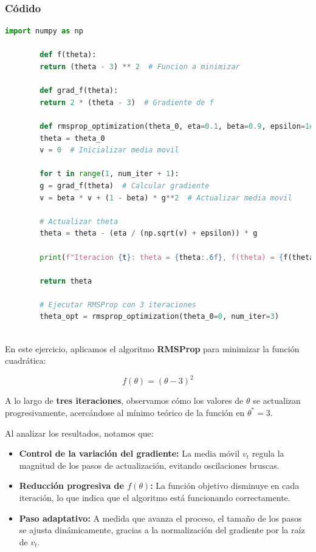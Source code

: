 \documentclass[a5paper]{article}
\begin{document}
	\subsubsection*{Códido}
	\begin{lstlisting}[language=Python, caption=Roor Mean Square Propagation, frame=single]
		import numpy as np
		
		def f(theta):
		return (theta - 3) ** 2  # Funcion a minimizar
		
		def grad_f(theta):
		return 2 * (theta - 3)  # Gradiente de f
		
		def rmsprop_optimization(theta_0, eta=0.1, beta=0.9, epsilon=1e-8, num_iter=3):
		theta = theta_0
		v = 0  # Inicializar media movil
		
		for t in range(1, num_iter + 1):
		g = grad_f(theta)  # Calcular gradiente
		v = beta * v + (1 - beta) * g**2  # Actualizar media movil
		
		# Actualizar theta
		theta = theta - (eta / (np.sqrt(v) + epsilon)) * g
		
		print(f"Iteracion {t}: theta = {theta:.6f}, f(theta) = {f(theta):.6f}, v = {v:.6f}")
		
		return theta
		
		# Ejecutar RMSProp con 3 iteraciones
		theta_opt = rmsprop_optimization(theta_0=0, num_iter=3)
		
	\end{lstlisting}
	
	En este ejercicio, aplicamos el algoritmo \textbf{RMSProp} para minimizar la función cuadrática:
	
	\[
	f(\theta) = (\theta - 3)^2
	\]
	
	A lo largo de \textbf{tres iteraciones}, observamos cómo los valores de \( \theta \) se actualizan progresivamente, acercándose al mínimo teórico de la función en \( \theta^* = 3 \).
	
	Al analizar los resultados, notamos que:
	
	\begin{itemize}
		\item \textbf{Control de la variación del gradiente:} La media móvil \( v_t \) regula la magnitud de los pasos de actualización, evitando oscilaciones bruscas.
		\item \textbf{Reducción progresiva de \( f(\theta) \):} La función objetivo disminuye en cada iteración, lo que indica que el algoritmo está funcionando correctamente.
		\item \textbf{Paso adaptativo:} A medida que avanza el proceso, el tamaño de los pasos se ajusta dinámicamente, gracias a la normalización del gradiente por la raíz de \( v_t \).
	\end{itemize}
	
\end{document}
